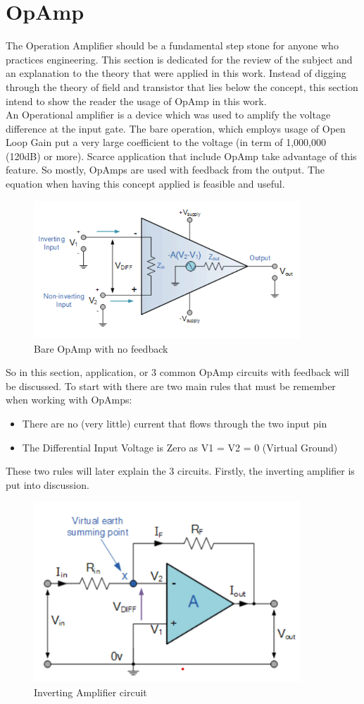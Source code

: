 \documentclass[12 pt, a4paper]{thesis}
\begin{document}
\section{OpAmp}
The Operation Amplifier should be a fundamental step stone for anyone who practices engineering. This section is dedicated for the review of the subject and an explanation to the theory that were applied in this work. Instead of digging through the theory of field and transistor that lies below the concept, this section intend to show the reader the usage of OpAmp in this work.\\
An Operational amplifier is a device which was used to amplify the voltage difference at the input gate. The bare operation, which employs usage of Open Loop Gain put a very large coefficient to the voltage (in term of 1,000,000 (120dB) or more). Scarce application that include OpAmp take advantage of this feature. So mostly, OpAmps are used with feedback from the output. The equation when having this concept applied is feasible and useful.\\
\begin{figure}[hbt!]
\centering
\includegraphics[width=100mm]{OpAmp_1.png}
\caption{Bare OpAmp with no feedback}
\end{figure}
So in this section, application, or 3 common OpAmp circuits with feedback will be discussed. To start with there are two main rules that must be remember when working with OpAmps:
\begin{itemize}
\item{There are no (very little) current that flows through the two input pin}
\item{The Differential Input Voltage is Zero as V1 = V2 = 0 (Virtual Ground)}
\end{itemize}
These two rules will later explain the 3 circuits. Firstly, the inverting amplifier is put into discussion.\\
\begin{figure}[hbt!]
\centering
\includegraphics[width=100mm]{OpAmp_2.png}
\caption{Inverting Amplifier circuit}
\end{figure}
\end{document}

